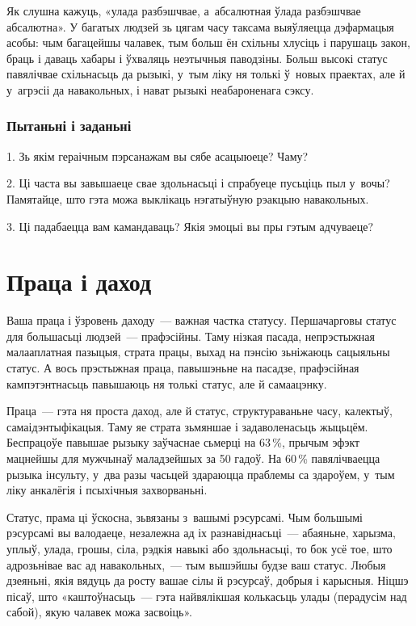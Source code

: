 Як слушна кажуць, «улада разбэшчвае, а~абсалютная ўлада разбэшчвае абсалютна». У багатых людзей зь цягам часу таксама выяўляецца дэфармацыя асобы: чым багацейшы чалавек, тым больш ён схільны хлусіць і парушаць закон, браць і даваць хабары і ўхваляць неэтычныя паводзіны. Больш высокі статус павялічвае схільнасьць да рызыкі, у~тым ліку ня толькі ў~новых праектах, але й у~агрэсіі да навакольных, і нават рызыкі неабароненага сэксу.

\subsubsection{Пытаньні і заданьні}

1. Зь якім гераічным пэрсанажам вы сябе асацыюеце? Чаму?

2. Ці часта вы завышаеце свае здольнасьці і спрабуеце пусьціць пыл у~вочы? Памятайце, што гэта можа выклікаць нэгатыўную рэакцыю навакольных.

3. Ці падабаецца вам камандаваць? Якія эмоцыі вы пры гэтым адчуваеце?


\section{Праца і даход}

Ваша праца і ўзровень даходу~--- важная частка статусу. Першачарговы статус для большасьці людзей~--- прафэсійны. Таму нізкая пасада, непрэстыжная малааплатная пазыцыя, страта працы, выхад на пэнсію зьніжаюць сацыяльны статус. А вось прэстыжная праца, павышэньне на пасадзе, прафэсійная кампэтэнтнасьць павышаюць ня толькі статус, але й самаацэнку.

Праца~--- гэта ня проста даход, але й статус, структураваньне часу, калектыў, самаідэнтыфікацыя. Таму яе страта зьмяншае і задаволенасьць жыцьцём. Беспрацоўе павышае рызыку заўчаснае сьмерці на 63\,\%, прычым эфэкт мацнейшы для мужчынаў маладзейшых за 50 гадоў. На 60\,\% павялічваецца рызыка інсульту, у~два разы часьцей здараюцца праблемы са здароўем, у~тым ліку анкалёгія і псыхічныя захворваньні.

Статус, прама ці ўскосна, зьвязаны з~вашымі рэсурсамі. Чым большымі рэсурсамі вы валодаеце, незалежна ад іх разнавіднасьці~--- абаяньне, харызма, уплыў, улада, грошы, сіла, рэдкія навыкі або здольнасьці, то бок усё тое, што адрозьнівае вас ад навакольных,~--- тым вышэйшы будзе ваш статус. Любыя дзеяньні, якія вядуць да росту вашае сілы й рэсурсаў, добрыя і карысныя. Ніцшэ пісаў, што «каштоўнасьць~--- гэта найвялікшая колькасьць улады (перадусім над сабой), якую чалавек можа засвоіць».

